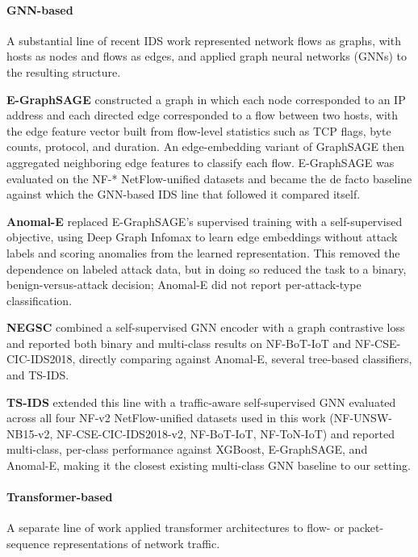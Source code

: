 \documentclass[sigconf]{acmart}
\begin{document}
\paragraph{GNN-based}
A substantial line of recent IDS work represented network flows as graphs, with hosts as nodes and flows as edges, and applied graph neural networks (GNNs) to the resulting structure.

\textbf{E-GraphSAGE} \citep{lo_e-graphsage_2022} constructed a graph in which each node corresponded to an IP address and each directed edge corresponded to a flow between two hosts, with the edge feature vector built from flow-level statistics such as TCP flags, byte counts, protocol, and duration. An edge-embedding variant of GraphSAGE then aggregated neighboring edge features to classify each flow. E-GraphSAGE was evaluated on the NF-* NetFlow-unified datasets and became the de facto baseline against which the GNN-based IDS line that followed it compared itself.

\textbf{Anomal-E} \citep{caville_anomal-e_2022} replaced E-GraphSAGE's supervised training with a self-supervised objective, using Deep Graph Infomax to learn edge embeddings without attack labels and scoring anomalies from the learned representation. This removed the dependence on labeled attack data, but in doing so reduced the task to a binary, benign-versus-attack decision; Anomal-E did not report per-attack-type classification.

\textbf{NEGSC} \citep{xu_negsc_2024} combined a self-supervised GNN encoder with a graph contrastive loss and reported both binary and multi-class results on NF-BoT-IoT and NF-CSE-CIC-IDS2018, directly comparing against Anomal-E, several tree-based classifiers, and TS-IDS.

\textbf{TS-IDS} \citep{nguyen_ts-ids_2023} extended this line with a traffic-aware self-supervised GNN evaluated across all four NF-v2 NetFlow-unified datasets used in this work (NF-UNSW-NB15-v2, NF-CSE-CIC-IDS2018-v2, NF-BoT-IoT, NF-ToN-IoT) and reported multi-class, per-class performance against XGBoost, E-GraphSAGE, and Anomal-E, making it the closest existing multi-class GNN baseline to our setting.

\paragraph{Transformer-based}
A separate line of work applied transformer architectures to flow- or packet-sequence representations of network traffic.
\end{document}
